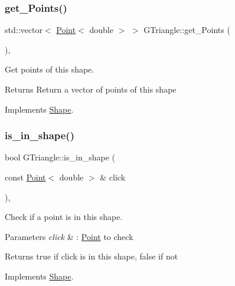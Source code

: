 \subsubsection{\texorpdfstring{get\+\_\+\+Points()}{get\_Points()}}
{\footnotesize\ttfamily std\+::vector$<$ \hyperlink{classPoint}{Point}$<$ double $>$ $>$ G\+Triangle\+::get\+\_\+\+Points (\begin{DoxyParamCaption}{ }\end{DoxyParamCaption})\hspace{0.3cm}{\ttfamily [override]}, {\ttfamily [virtual]}}



Get points of this shape. 

\begin{DoxyReturn}{Returns}
Return a vector of points of this shape 
\end{DoxyReturn}


Implements \hyperlink{classShape_add74a5c682840fa4a519242b1ddbd0b5}{Shape}.

\mbox{\label{classGTriangle_abb6f7243155483cc6de301931e87475a}} 
\subsubsection{\texorpdfstring{is\+\_\+in\+\_\+shape()}{is\_in\_shape()}}
{\footnotesize\ttfamily bool G\+Triangle\+::is\+\_\+in\+\_\+shape (\begin{DoxyParamCaption}\item[{const \hyperlink{classPoint}{Point}$<$ double $>$ \&}]{click }\end{DoxyParamCaption})\hspace{0.3cm}{\ttfamily [override]}, {\ttfamily [virtual]}}



Check if a point is in this shape. 


\begin{DoxyParams}{Parameters}
{\em click} & \+: \hyperlink{classPoint}{Point} to check \\
\hline
\end{DoxyParams}
\begin{DoxyReturn}{Returns}
true if click is in this shape, false if not 
\end{DoxyReturn}


Implements \hyperlink{classShape_aa09a621da090e42840b4bec7ffb27620}{Shape}.

